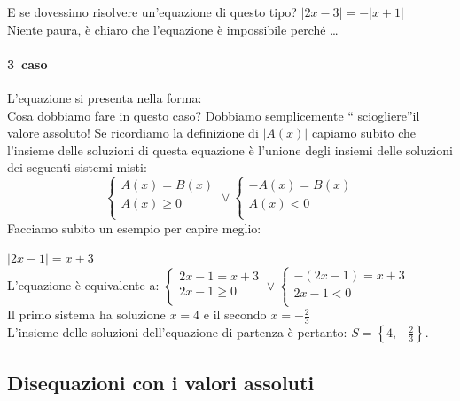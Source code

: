 \begin{esempio}
E se dovessimo risolvere un'equazione di questo tipo? \(|2x-3|=-|x+1|\) \\[4pt]
Niente paura, è chiaro che l'equazione è impossibile perché \dots
\end{esempio}

\paragraph{3\textdegree~caso} L'equazione si presenta nella forma:  
\\[4pt]
Cosa dobbiamo fare in questo caso? Dobbiamo semplicemente \textquotedblleft 
sciogliere\textquotedblright il valore assoluto!
Se ricordiamo la definizione di \(|A(x)|\) capiamo subito che l'insieme delle 
soluzioni di questa equazione è l'unione degli insiemi delle soluzioni dei 
seguenti sistemi misti:
\[
\left\lbrace 
\begin{array}{l}
A(x)=B(x)\\
A(x)\geq 0\\
\end{array}
\right.
\vee
\left\lbrace 
\begin{array}{l}
-A(x)=B(x)\\
A(x)< 0\\
\end{array}
\right.
\]
Facciamo subito un esempio per capire meglio:
\begin{esempio}  \(|2x-1|=x+3\)\\[4pt] L'equazione è equivalente a:
\(
\left\lbrace 
\begin{array}{l}
2x-1=x+3\\
2x-1\geq 0\\
\end{array}
\right.
\vee
\left\lbrace 
\begin{array}{l}
-(2x-1)=x+3\\
2x-1< 0\\
\end{array}
\right.
\) \\
Il primo sistema ha soluzione \(x=4\) e il secondo \(x=-\frac{2}{3}\)\\[4pt]
L'insieme delle soluzioni dell'equazione di partenza è pertanto: 
\(S=\left\lbrace 4,-\frac{2}{3} \right\rbrace \).
\end{esempio}

\subsection{Disequazioni con i valori assoluti}

